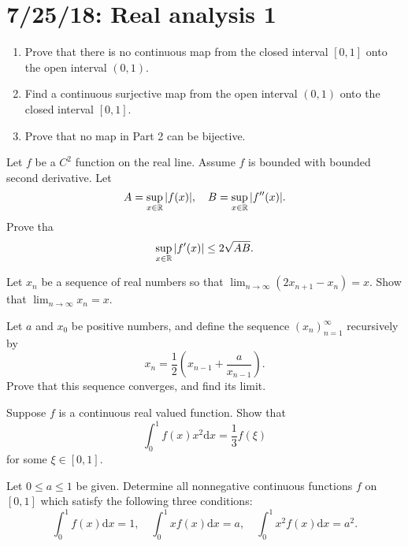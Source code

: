 \section{7/25/18: Real analysis 1}
\begin{problem}\hfill
	\begin{enumerate}
		\item Prove that there is no continuous map from the closed interval $[0,1]$ onto the open interval $(0,1)$.
		\item Find a continuous surjective map from the open interval $(0,1)$ onto the closed interval $[0,1]$.
		\item Prove that no map in Part 2 can be bijective.
	\end{enumerate}
\end{problem}

\begin{problem}
	Let $f$ be a $C^2$ function on the real line. Assume $f$ is bounded with bounded second derivative. Let
	\[
		A = \sup_{x\in \mathbb{R}} |f(x)|, \quad B = \sup_{x\in \mathbb{R}} |f''(x)|.
	\]
	Prove tha
	\[
		\sup_{x\in \mathbb{R}} |f'(x)| \leq 2\sqrt{AB}.
	\]
\end{problem}

\begin{problem}
	Let $x_n$ be a sequence of real numbers so that $\lim_{n\to \infty} (2x_{n+1} - x_n) = x$. Show that $\lim_{n\to\infty} x_n = x$.
\end{problem}

\begin{problem}
	Let $a$ and $x_0$ be positive numbers, and define the sequence $(x_n)_{n=1}^\infty$ recursively by
	\[
		x_n = \frac{1}{2}\left( x_{n-1} + \frac{a}{x_{n-1}}\right).
	\]
	Prove that this sequence converges, and find its limit.
\end{problem}

\begin{problem}
	Suppose $f$ is a continuous real valued function. Show that
	\[
		\int_0^1 f(x)x^2 \mathrm{d}x = \frac{1}{3} f(\xi)
	\]
	for some $\xi \in [0,1]$.
\end{problem}

\begin{problem}
	Let $0\leq a \leq 1$ be given. Determine all nonnegative continuous functions $f$ on $[0,1]$ which satisfy the following three conditions:
	\[
		\int_0^1 f(x) \mathrm{d}x = 1, \quad \int_0^1 xf(x) \mathrm{d}x = a, \quad \int_0^1 x^2 f(x) \mathrm{d}x = a^2.
	\]
\end{problem}
